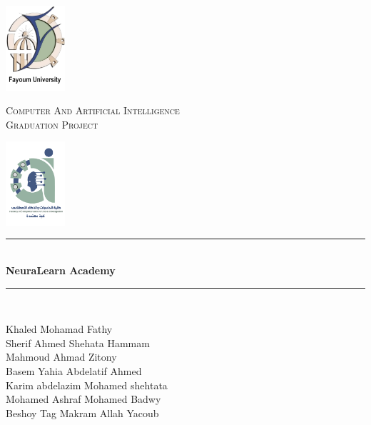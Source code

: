 \begin{titlepage} 
	\newcommand{\HRule}{\rule{\linewidth}{0.5mm}} %
	
	\begin{center}
		\begin{minipage}{0.15\textwidth}%
			\includegraphics[width=2.2cm]{content/Logo copy.png}
		\end{minipage}
		\begin{minipage}{0.69\textwidth}%
			\center
			\textsc{\large  Computer And Artificial Intelligence}\\[0.5cm]
			\textsc{\normalsize Graduation Project}\\[0.5cm]
		\end{minipage}\hfill
		\begin{minipage}{0.15\textwidth}%
			\includegraphics[width=2.2cm]{content/faculty.png}
        \end{minipage}
	\end{center}

	\center %
	
	\vspace{3cm}
	\HRule\\[0.4cm]
	
	{\huge\bfseries NeuraLearn Academy}\\[0.4cm] %
	
	\HRule\\[1.5cm]
	
	\begin{spacing}{1}
		\begin{center}
			\large
			Khaled Mohamad Fathy \\
			Sherif Ahmed Shehata Hammam \\
			Mahmoud Ahmad Zitony \\
			Basem Yahia Abdelatif Ahmed \\ 
			Karim abdelazim Mohamed shehtata \\
			Mohamed Ashraf Mohamed Badwy \\ 
			Beshoy Tag Makram Allah Yacoub \\
			\vspace{50mm}
		\end{center}
	\end{spacing}


\end{titlepage}
